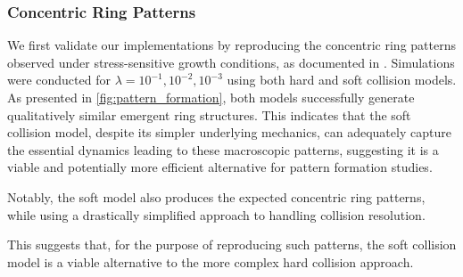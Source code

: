 \documentclass[conference]{IEEEtran}
\begin{document}
\subsubsection{Concentric Ring Patterns}

We first validate our implementations by reproducing the concentric ring patterns observed under stress-sensitive growth conditions, as documented in \cite{Weady2024}. Simulations were conducted for $\lambda = 10^{-1}, 10^{-2}, 10^{-3}$ using both hard and soft collision models. As presented in \autoref{fig:pattern_formation}, both models successfully generate qualitatively similar emergent ring structures. This indicates that the soft collision model, despite its simpler underlying mechanics, can adequately capture the essential dynamics leading to these macroscopic patterns, suggesting it is a viable and potentially more efficient alternative for pattern formation studies.


Notably, the soft model also produces the expected concentric ring patterns, while using a drastically simplified approach to handling collision resolution.

This suggests that, for the purpose of reproducing such patterns, the soft collision model is a viable alternative to the more complex hard collision approach.
\end{document}
